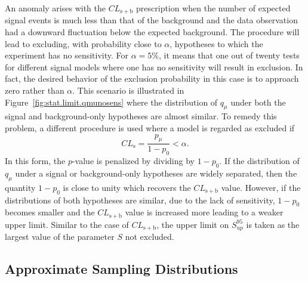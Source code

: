 An anomaly arises with the $CL_\mathrm{s+b}$ prescription when the number of expected signal events is much less than that of 
the background and the data observation had a downward fluctuation below the expected background.
The procedure will lead to excluding, with probability close to $\alpha$, hypotheses to which the experiment has no sensitivity.
For $\alpha=5\%$, it means that one out of twenty tests for different signal models where one has no sensitivity will result in exclusion.
In fact, the desired behavior of the exclusion probability in this case is to approach zero rather than $\alpha$.
This scenario is illustrated in Figure~\ref{fig:stat.limit.qmunosens} where the distribution of $q_{\mu}$
under both the signal and background-only hypotheses are almost similar. 
To remedy this problem, a different procedure is used where a model is regarded as excluded if 
\begin{equation}
  CL_\mathrm{s}  = \frac
{p_{\mu}}
{1-p_{0}}
< \alpha.
\end{equation}
In this form, the $p$-value is penalized by dividing by $1-p_{0}$. 
If the distribution of $q_{\mu}$ under a signal or background-only hypotheses 
are widely separated, then 
the quantity $1-p_{0}$ is close to unity which recovers the $CL_\mathrm{s+b}$ value. However, if
the distributions of both hypotheses are similar, due to the lack of sensitivity, $1-p_{0}$ becomes smaller
and the $CL_\mathrm{s+b}$ value is increased more leading to a weaker upper limit. 
Similar to the case of $CL_\mathrm{s+b}$, the upper limit on $S_{up}^{95}$ is taken as the largest value of the parameter
$S$ not excluded.

\subsection{Approximate Sampling Distributions}

